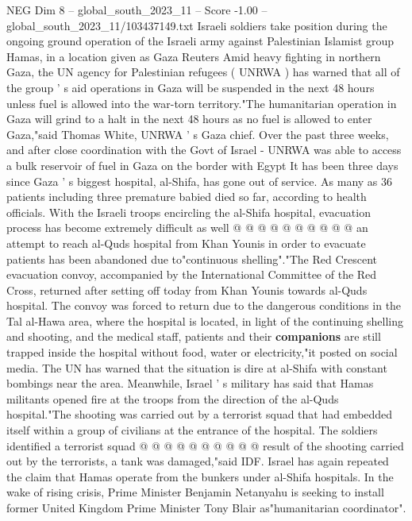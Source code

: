 \begin{textsample}{NEG Dim 8 – global\_south\_2023\_11 – Score -1.00 – global\_south\_2023\_11/103437149.txt}  \label{ex:f8_neg_184}
Israeli soldiers take position during the ongoing ground operation of the Israeli army against Palestinian Islamist group Hamas, in a location given as Gaza Reuters Amid heavy fighting in northern Gaza, the UN agency for Palestinian refugees ( UNRWA ) has warned that all of the group ' s aid operations in Gaza will be suspended in the next 48 hours unless fuel is allowed into the war-torn territory."The humanitarian operation in Gaza will grind to a halt in the next 48 hours as no fuel is allowed to enter Gaza,"said Thomas White, UNRWA ' s Gaza chief.
Over the past three weeks, and after close coordination with the Govt of Israel - UNRWA was able to access a bulk reservoir of fuel in Gaza on the border with Egypt It has been three days since Gaza ' s biggest hospital, al-Shifa, has gone out of service.
As many as 36 patients including three premature babied died so far, according to health officials.
With the Israeli troops encircling the al-Shifa hospital, evacuation process has become extremely difficult as well @ @ @ @ @ @ @ @ @ @ an attempt to reach al-Quds hospital from Khan Younis in order to evacuate patients has been abandoned due to"continuous shelling"."The Red Crescent evacuation convoy, accompanied by the International Committee of the Red Cross, returned after setting off today from Khan Younis towards al-Quds hospital.
The convoy was forced to return due to the dangerous conditions in the Tal al-Hawa area, where the hospital is located, in light of the continuing shelling and shooting, and the medical staff, patients and their \textbf{companions} are still trapped inside the hospital without food, water or electricity,"it posted on social media.
The UN has warned that the situation is dire at al-Shifa with constant bombings near the area.
Meanwhile, Israel ' s military has said that Hamas militants opened fire at the troops from the direction of the al-Quds hospital."The shooting was carried out by a terrorist squad that had embedded itself within a group of civilians at the entrance of the hospital.
The soldiers identified a terrorist squad @ @ @ @ @ @ @ @ @ @ result of the shooting carried out by the terrorists, a tank was damaged,"said IDF.
Israel has again repeated the claim that Hamas operate from the bunkers under al-Shifa hospitals.
In the wake of rising crisis, Prime Minister Benjamin Netanyahu is seeking to install former United Kingdom Prime Minister Tony Blair as"humanitarian coordinator".

\end{textsample}

